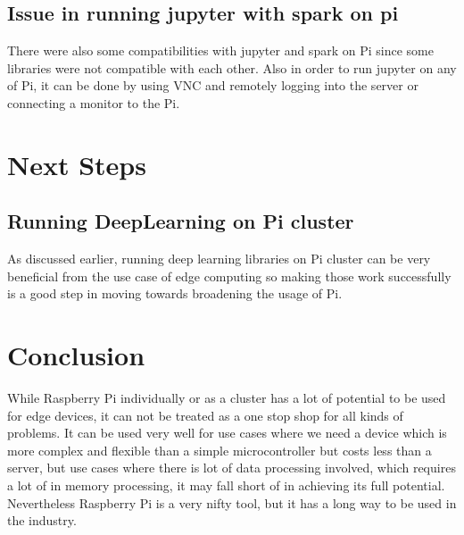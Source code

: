 \subsection{Issue in running jupyter with spark on pi}

There were also some compatibilities with jupyter and spark on Pi
since some libraries were not compatible with each other. Also in
order to run jupyter on any of Pi, it can be done by using VNC and
remotely logging into the server or connecting a monitor to the Pi.

\section{Next Steps}


\subsection{Running DeepLearning on Pi cluster}

As discussed earlier, running deep learning libraries on Pi cluster
can be very beneficial from the use case of edge computing so making
those work successfully is a good step in moving towards broadening
the usage of Pi.

\section{Conclusion}

While Raspberry Pi individually or as a cluster has a lot of potential
to be used for edge devices, it can not be treated as a one stop shop
for all kinds of problems. It can be used very well for use cases
where we need a device which is more complex and flexible than a
simple microcontroller but costs less than a server, but use cases
where there is lot of data processing involved, which requires a lot
of in memory processing, it may fall short of in achieving its full
potential. Nevertheless Raspberry Pi is a very nifty tool, but it has
a long way to be used in the industry.

 


